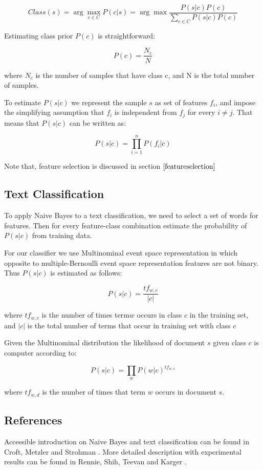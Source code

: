 \documentclass{report}
\begin{document}
\[
Class(s)  = \arg \max_{c \in C} P(c|s) = \arg \max \frac{P(s|c)P(c)}{\sum_{c \in C} P(s|c)P(c)}
\]

Estimating class prior $P(c)$ is straightforward:

\[
P(c) = \frac{N_c}{N}
\]

where $N_c$ is the number of samples that have class c, and N is the total number of samples.

To estimate $P(s|c)$ we represent the sample $s$ as set of features $f_i$, and impose the simplifying assumption that $f_i$ is independent from $f_j$  for every $i \neq j$. That means that $P(s|c)$ can be written as:

\[
P(s|c) = \prod_{i=1}^n P(f_i|c)
\]

Note that, feature selection is discussed in section  $\ref{featureselection}$

\subsection{Text Classification}

To apply Naive Bayes to a text classification, we need to select a set of words for features. Then for every feature-class combination estimate the probability of $P(s|c)$ from training data.

For our classifier we use Multinominal event space representation in which opposite to multiple-Bernoulli event space representation features are not binary. Thus $P(s|c)$ is estimated as follows:

\[
P(s|c) = \frac{tf_{w,c}}{|c|}
\]

where $tf_{w,c}$ is the number of times term$w$ occurs in class $c$ in the training set, and $|c|$ is the total number of terms that occur in training set with class $c$

Given the Multinominal distribution the likelihood of document $s$ given class $c$ is computer according to:

\[
P(s|c) = \prod_{w} P(w|c)^{tf_{w,s}}
\]

where $tf_{w,d}$ is the number of times that term $w$ occurs in document $s$.

\subsection{References}

Accessible introduction on Naive Bayes and text classification can be found in Croft, Metzler and Strohman \cite{Croft:2010:SEI}. More detailed description with experimental results can be found in Rennie, Shih, Teevan and Karger \cite{Rennie03}.
\end{document}
